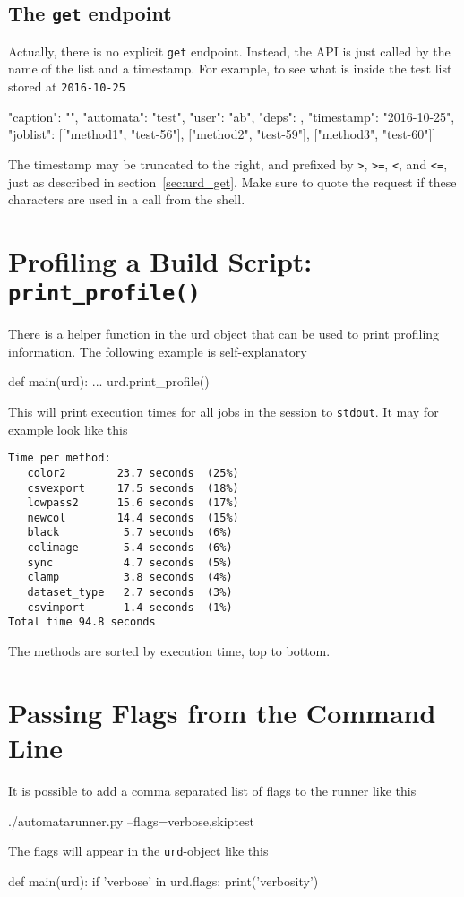 \subsection{The \texttt{get} endpoint}
Actually, there is no explicit \texttt{get} endpoint.  Instead, the
API is just called by the name of the list and a timestamp.  For
example, to see what is inside the test list stored
at \texttt{2016-10-25}
\begin{shell}
{"caption": "", "automata": "test", "user": "ab", "deps": {},
  "timestamp": "2016-10-25", "joblist": [["method1", "test-56"],
  ["method2", "test-59"], ["method3", "test-60"]]}
\end{shell}
The timestamp may be truncated to the right, and prefixed
by \texttt{>}, \texttt{>=}, \texttt{<}, and \texttt{<=}, just as
described in section~\ref{sec:urd_get}.  Make sure to quote the
request if these characters are used in a call from the shell.



\section{Profiling a Build Script:  \texttt{print\_profile()}}
There is a helper function in the urd object that can be used to print
profiling information.  The following example is self-explanatory
\begin{python}
def main(urd):
    ...
    urd.print_profile()
\end{python}
This will print execution times for all jobs in the session
to \texttt{stdout}.  It may for example look like this
\begin{verbatim}
Time per method:
   color2        23.7 seconds  (25%)
   csvexport     17.5 seconds  (18%)
   lowpass2      15.6 seconds  (17%)
   newcol        14.4 seconds  (15%)
   black          5.7 seconds  (6%)
   colimage       5.4 seconds  (6%)
   sync           4.7 seconds  (5%)
   clamp          3.8 seconds  (4%)
   dataset_type   2.7 seconds  (3%)
   csvimport      1.4 seconds  (1%)
Total time 94.8 seconds
\end{verbatim}
The methods are sorted by execution time, top to bottom.


\section{Passing Flags from the Command Line}
It is possible to add a comma separated list of flags to the runner
like this
\begin{python}
./automatarunner.py --flags=verbose,skiptest
\end{python}
The flags will appear in the \texttt{urd}-object like this
\begin{python}
def main(urd):
    if 'verbose' in urd.flags:
       print('verbosity')
\end{python}



